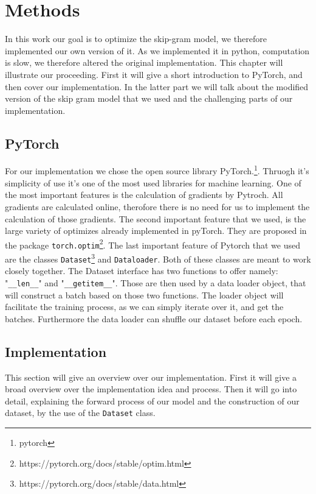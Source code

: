 \chapter{Methods}\label{chap:methods}

In this work our goal is to optimize the skip-gram model, we therefore implemented our own version of it. As we implemented it in python, computation is slow, we therefore altered the original implementation. 
This chapter will illustrate our proceeding. First it will give a short introduction to PyTorch, and then cover our implementation. In the latter part we will talk about the modified version of the skip gram model that we used and the challenging parts of our implementation.
\section{PyTorch}
For our implementation we chose the open source library PyTorch.\footnote{pytorch}. Thruogh it's simplicity of use it's one of the most used libraries for machine learning. One of the most important features is the calculation of gradients by Pytroch. All gradients are calculated online, therofore there is no need for us to implement the calculation of those gradients. The second important feature that we used, is the large variety of optimizes already implemented in pyTorch. They are proposed in the package \texttt{torch.optim}\footnote{https://pytorch.org/docs/stable/optim.html}. The last important feature of Pytorch that we used are the classes \texttt{Dataset}\footnote{\label{note_data}https://pytorch.org/docs/stable/data.html} and \texttt{Dataloader}\footnotemark[\ref{note_data}]. Both of these classes are meant to work closely together.   The Dataset interface has two functions to offer namely: "\texttt{\_\_len\_\_}" and "\texttt{\_\_getitem\_\_}". Those are then used by a data loader object, that will construct a batch based on those two functions. The loader object will facilitate the training process, as we can simply iterate over it, and get the batches. Furthermore the data loader can shuffle our dataset before each epoch. 
\section{Implementation}
This section will give an overview over our implementation. First it will give a broad overview over the implementation idea and process. Then it will go into detail, explaining the forward process of our model and the construction of our dataset, by the use of the \texttt{Dataset} class. 
